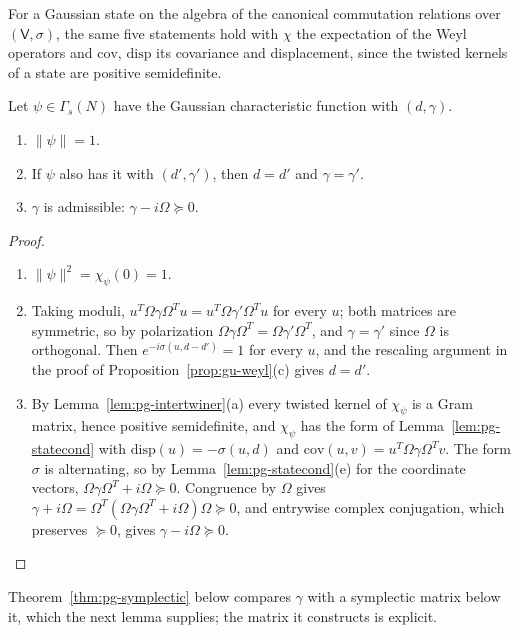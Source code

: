 \begin{veteenv}
For a Gaussian state on the algebra of the canonical commutation relations over $(\mathsf V,\sigma)$, the same five statements hold with
$\chi$ the expectation of the Weyl operators and $\mathrm{cov}$, $\mathrm{disp}$ its covariance and displacement, since the twisted kernels of a
state are positive semidefinite.

\begin{lemma}\label{lem:pg-gauss}
Let $\psi\in\Gamma_s(N)$ have the Gaussian characteristic function with $(d,\gamma)$.
\begin{enumerate}
\item[(a)] $\lVert\psi\rVert=1$.
\item[(b)] If $\psi$ also has it with $(d',\gamma')$, then $d=d'$ and $\gamma=\gamma'$.
\item[(c)] $\gamma$ is admissible: $\gamma-i\Omega\succeq0$.
\end{enumerate}
\end{lemma}

\begin{proof}
\begin{enumerate}
\item[(a)] $\lVert\psi\rVert^2=\chi_\psi(0)=1$.
\item[(b)] Taking moduli, $u^T\Omega\gamma\Omega^Tu=u^T\Omega\gamma'\Omega^Tu$ for every $u$; both matrices are symmetric, so by polarization
$\Omega\gamma\Omega^T=\Omega\gamma'\Omega^T$, and $\gamma=\gamma'$ since $\Omega$ is orthogonal. Then $e^{-i\sigma(u,d-d')}=1$ for every $u$, and the
rescaling argument in the proof of Proposition~\ref{prop:gu-weyl}(c) gives $d=d'$.
\item[(c)] By Lemma~\ref{lem:pg-intertwiner}(a) every twisted kernel of $\chi_\psi$ is a Gram matrix, hence positive semidefinite, and
$\chi_\psi$ has the form of Lemma~\ref{lem:pg-statecond} with $\mathrm{disp}(u)=-\sigma(u,d)$ and $\mathrm{cov}(u,v)=u^T\Omega\gamma\Omega^Tv$. The form
$\sigma$ is alternating, so by Lemma~\ref{lem:pg-statecond}(e) for the coordinate vectors, $\Omega\gamma\Omega^T+i\Omega\succeq0$. Congruence by
$\Omega$ gives $\gamma+i\Omega=\Omega^T(\Omega\gamma\Omega^T+i\Omega)\Omega\succeq0$, and entrywise complex conjugation, which preserves
$\succeq0$, gives $\gamma-i\Omega\succeq0$.\qedhere
\end{enumerate}
\end{proof}

Theorem~\ref{thm:pg-symplectic} below compares $\gamma$ with a symplectic matrix below it, which the next lemma supplies; the
matrix it constructs is explicit.


\end{veteenv}
